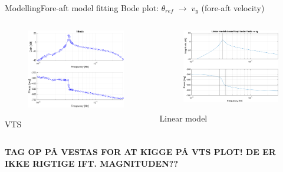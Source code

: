 \begin{frame}{Modelling}{Fore-aft model fitting}
	Bode plot: $ \theta_{ref} \; \rightarrow \; v_y $ (fore-aft velocity) 
	\begin{columns}
		\begin{column}{.49\textwidth}
			\begin{figure}[ht]
				\centering
				\includegraphics[width=1\linewidth]{../Graphics/TestResults/foreaftFitting/sysid_thSine-vy_16ms.png}
				\label{fig:sysid_wref-vy_16}
			\end{figure}
			\centering VTS
		\end{column}
	
		\begin{column}{.49\textwidth}
			\begin{figure}[ht]
				\centering
				\includegraphics[width=1\linewidth]{../Graphics/TestResults/foreaftFitting/wtLin_th-vy_16msV2.png}
				\label{fig:wtlin_wref-vy_16}
			\end{figure}
			\centering Linear model
		\end{column}
	\end{columns}

	\textbf{TAG OP PÅ VESTAS FOR AT KIGGE PÅ VTS PLOT! DE ER IKKE RIGTIGE IFT. MAGNITUDEN??}
	
\end{frame}

